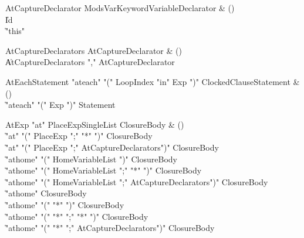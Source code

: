 \begin{bbgrammar}

AtCaptureDeclarator \label{prod:AtCaptureDeclarator}  \: Mods\opt VarKeyword\opt VariableDeclarator & () \\

    \| Id \\
    \| \xcd"this" \\

\end{bbgrammar}

\begin{bbgrammar}

AtCaptureDeclarators \label{prod:AtCaptureDeclarators}  \: AtCaptureDeclarator & () \\

    \| AtCaptureDeclarators \xcd"," AtCaptureDeclarator \\

\end{bbgrammar}

\begin{bbgrammar}

AtEachStatement \label{prod:AtEachStatement}  \: \xcd"ateach" \xcd"(" LoopIndex \xcd"in" Exp \xcd")" ClockedClause\opt Statement & () \\

    \| \xcd"ateach" \xcd"(" Exp \xcd")" Statement \\

\end{bbgrammar}

\begin{bbgrammar}

AtExp \label{prod:AtExp}  \: \xcd"at" PlaceExpSingleList ClosureBody & () \\

    \| \xcd"at" \xcd"(" PlaceExp \xcd";" \xcd"*" \xcd")" ClosureBody \\
    \| \xcd"at" \xcd"(" PlaceExp \xcd";" AtCaptureDeclarators\opt \xcd")" ClosureBody \\
    \| \xcd"athome" \xcd"(" HomeVariableList \xcd")" ClosureBody \\
    \| \xcd"athome" \xcd"(" HomeVariableList \xcd";" \xcd"*" \xcd")" ClosureBody \\
    \| \xcd"athome" \xcd"(" HomeVariableList \xcd";" AtCaptureDeclarators\opt \xcd")" ClosureBody \\
    \| \xcd"athome" ClosureBody \\
    \| \xcd"athome" \xcd"(" \xcd"*" \xcd")" ClosureBody \\
    \| \xcd"athome" \xcd"(" \xcd"*" \xcd";" \xcd"*" \xcd")" ClosureBody \\
    \| \xcd"athome" \xcd"(" \xcd"*" \xcd";" AtCaptureDeclarators\opt \xcd")" ClosureBody \\

\end{bbgrammar}


